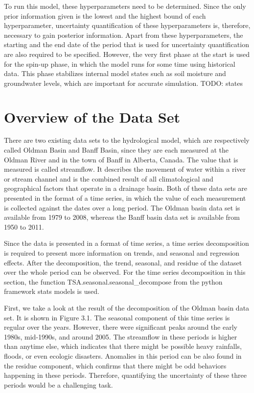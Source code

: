 To run this model, these hyperparameters need to be determined. Since the only prior information given is the lowest and the highest bound of each hyperparameter, uncertainty quantification of these hyperparameters is, therefore, necessary to gain posterior information. Apart from these hyperparameters, the starting and the end date of the period that is used for uncertainty quantification are also required to be specified.\cite{hydrology} However, the very first phase at the start is used for the spin-up phase, in which the model runs for some time using historical data. This phase stabilizes internal model states such as soil moisture and groundwater levels, which are important for accurate simulation.\cite{hydrology}
TODO: states

\section{Overview of the Data Set}
There are two existing data sets to the hydrological model, which are respectively called Oldman Basin and Banff Basin, since they are each measured at the Oldman River and in the town of Banff in Alberta, Canada.\cite{hydrology_dataset} The value that is measured is called streamflow. It describes the movement of water within a river or stream channel and is the combined result of all climatological and geographical factors that operate in a drainage basin.\cite{streamflow} Both of these data sets are presented in the format of a time series, in which the value of each measurement is collected against the dates over a long period. The Oldman basin data set is available from 1979 to 2008, whereas the Banff basin data set is available from 1950 to 2011.\cite{hydrology} 

Since the data is presented in a format of time series, a time series decomposition is required to present more information on trends, and seasonal and regression effects.\cite{time_series} After the decomposition, the trend, seasonal, and residue of the dataset over the whole period can be observed. For the time series decomposition in this section, the function TSA.seasonal.seasonal\_decompose from the python framework stats models is used.\cite{stat_models_decompose}

First, we take a look at the result of the decomposition of the Oldman basin data set. It is shown in Figure 3.1. The seasonal component of this time series is regular over the years. However, there were significant peaks around the early 1980s, mid-1990s, and around 2005. The streamflow in these periods is higher than anytime else, which indicates that there might be possible heavy rainfalls, floods\cite{hydrology}, or even ecologic disasters. Anomalies in this period can be also found in the residue component, which confirms that there might be odd behaviors happening in these periods. Therefore, quantifying the uncertainty of these three periods would be a challenging task.

